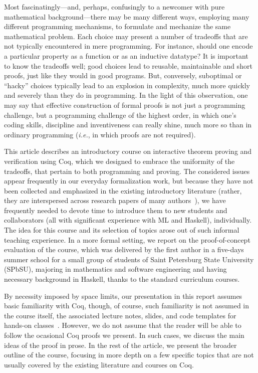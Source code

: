 \documentclass[blockstyle,preprint]{sigplanconf}
\newcommand{\ie}{\emph{i.e.}\xspace}
\begin{document}
Most fascinatingly---and, perhaps, confusingly to a newcomer with pure
mathematical background---there may be many different ways, employing
many different programming mechanisms, to formulate and mechanize the
same mathematical problem. Each choice may present a number of
tradeoffs that are not typically encountered in mere programming. For
instance, should one encode a particular property as a function or as
an inductive datatype? It is important to know the tradeoffs well;
good choices lead to reusable, maintainable and short proofs, just
like they would in good programs. But, conversely, suboptimal or
``hacky'' choices typically lead to an explosion in complexity, much
more quickly and severely than they do in programming.
%
In the light of this observation, one may say that effective
construction of formal proofs is not just a programming challenge, but
a programming challenge of the highest order, in which one's coding
skills, discipline and inventiveness can really shine, much more so
than in ordinary programming (\ie, in which proofs are not required).

This article describes an introductory course on interactive theorem
proving and verification using Coq, which we designed to embrace the
uniformity of the tradeoffs, that pertain to both programming and
proving. The considered issues appear frequently in our everyday
formalization work, but because they have not been collected and
emphasized in the existing introductory literature (rather, they are
interspersed across research papers of many
authors~\cite{Garillot:PhD,Mahboubi-Tassi:ITP13,Garillot-al:TPHOL09,Gonthier-al:JFP13,Gonthier-al:TR,Paulin-Mohring:TLCA93}),
we have frequently needed to devote time to introduce them to new
students and collaborators (all with significant experience with ML
and Haskell), individually. The idea for this course and its selection
of topics arose out of such informal teaching experience. In a more
formal setting, we report on the proof-of-concept evaluation of the
course, which was delivered by the first author in a five-days summer
school for a small group of students of Saint Petersburg State
University (SPbSU), majoring in mathematics and software engineering
and having necessary background in Haskell, thanks to the standard
curriculum courses.

By necessity imposed by space limits, our presentation in this report
assumes basic familiarity with Coq, though, of course, such
familiarity is not assumed in the course itself, the associated
lecture notes, slides, and code templates for hands-on
classes~\cite{Sergey:PnP}. However, we do not assume that the reader
will be able to follow the ocasional Coq proofs we present. In such
cases, we discuss the main ideas of the proof in prose. In the rest of
the article, we present the broader outline of the course, focusing in
more depth on a few specific topics that are not usually covered by
the existing literature and courses on Coq.
\end{document}
